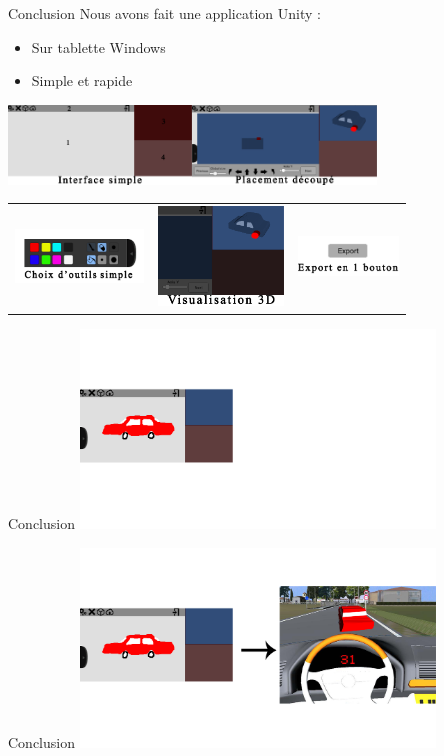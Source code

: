 \documentclass[a4paper,10pt]{beamer}
\begin{document}
	\begin{frame}{Conclusion}
		Nous avons fait une application Unity :
		\begin{itemize}
			\item \pause Sur tablette Windows\pause
			\item Simple et rapide\pause
		\end{itemize}
		\centerline{\includegraphics[height=60pt]{images/conclu/menu.png}\pause\hspace{10 mm}\includegraphics[height=60pt]{images/conclu/place.png}\pause}
		\begin{tabular}{lll}
			\includegraphics[height=40pt]{images/conclu/outils.png} & \pause\includegraphics[height=75pt]{images/conclu/visu.png}\pause & \includegraphics[height=30pt]{images/conclu/export.png}
		\end{tabular}
		 
	\end{frame}
	
	\begin{frame}{Conclusion}
		\includegraphics[height=150pt]{images/conclu/avant.png}
	\end{frame}
	\begin{frame}{Conclusion}
		\includegraphics[height=150pt]{images/conclu/apres.png}
	\end{frame}
\end{document}
